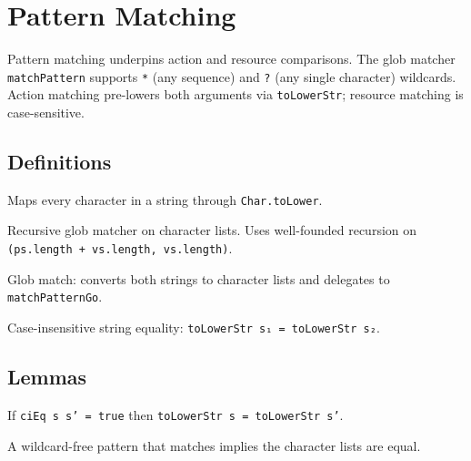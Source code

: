 \chapter{Pattern Matching}\label{chap:pattern}

Pattern matching underpins action and resource comparisons.
The glob matcher \texttt{matchPattern} supports \texttt{*} (any sequence)
and \texttt{?} (any single character) wildcards.  Action matching
pre-lowers both arguments via \texttt{toLowerStr}; resource matching
is case-sensitive.

\section{Definitions}

\begin{definition}[toLowerStr]\label{def:toLowerStr}
\leanok
Maps every character in a string through \texttt{Char.toLower}.
\end{definition}

\begin{definition}[matchPatternGo]\label{def:matchPatternGo}
\leanok
Recursive glob matcher on character lists.  Uses well-founded
recursion on \texttt{(ps.length + vs.length, vs.length)}.
\end{definition}

\begin{definition}[matchPattern]\label{def:matchPattern}
\leanok
Glob match: converts both strings to character lists and delegates
to \texttt{matchPatternGo}.
\end{definition}

\begin{definition}[ciEq]\label{def:ciEq}
\leanok
Case-insensitive string equality: \texttt{toLowerStr s₁ = toLowerStr s₂}.
\end{definition}

\section{Lemmas}

\begin{lemma}\label{lem:ciEq_toLowerStr}
\leanok
If \texttt{ciEq s s' = true} then \texttt{toLowerStr s = toLowerStr s'}.
\end{lemma}

\begin{lemma}\label{lem:matchPatternGo_literal_eq}
\leanok
A wildcard-free pattern that matches implies the character lists are equal.
\end{lemma}

